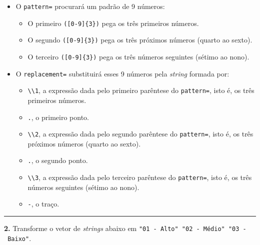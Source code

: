 \documentclass[
]{book}
\providecommand{\tightlist}{%
  \setlength{\itemsep}{0pt}\setlength{\parskip}{0pt}}
\begin{document}
\begin{itemize}
\tightlist
\item
  O \texttt{pattern=} procurará um padrão de 9 números:

  \begin{itemize}
  \tightlist
  \item
    O primeiro \texttt{({[}0-9{]}\{3\})} pega os três primeiros números.
  \item
    O segundo \texttt{({[}0-9{]}\{3\})} pega os três próximos números (quarto ao sexto).
  \item
    O terceiro \texttt{({[}0-9{]}\{3\})} pega os três números seguintes (sétimo ao nono).
  \end{itemize}
\item
  O \texttt{replacement=} substituirá esses 9 números pela \emph{string} formada por:

  \begin{itemize}
  \tightlist
  \item
    \texttt{\textbackslash{}\textbackslash{}1}, a expressão dada pelo primeiro parêntese do \texttt{pattern=}, isto é, os três primeiros números.
  \item
    \texttt{.}, o primeiro ponto.
  \item
    \texttt{\textbackslash{}\textbackslash{}2}, a expressão dada pelo segundo parêntese do \texttt{pattern=}, isto é, os três próximos números (quarto ao sexto).
  \item
    \texttt{.}, o segundo ponto.
  \item
    \texttt{\textbackslash{}\textbackslash{}3}, a expressão dada pelo terceiro parêntese do \texttt{pattern=}, isto é, os três números seguintes (sétimo ao nono).
  \item
    \texttt{-}, o traço.
  \end{itemize}
\end{itemize}

\begin{center}\rule{0.5\linewidth}{0.5pt}\end{center}

\textbf{2.} Transforme o vetor de \emph{strings} abaixo em \texttt{"01\ -\ Alto"\ "02\ -\ Médio"\ "03\ -\ Baixo"}.
\end{document}
